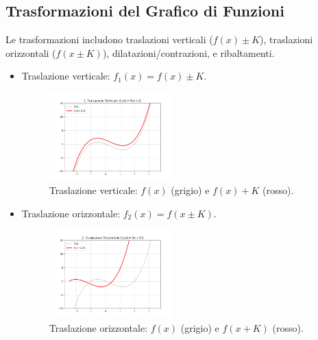 \documentclass[oneside,10pt]{book} %
\begin{document}
\subsection{Trasformazioni del Grafico di Funzioni}
Le trasformazioni includono traslazioni verticali ($f(x) \pm K$), traslazioni orizzontali ($f(x \pm K)$), dilatazioni/contrazioni, e ribaltamenti.

\begin{itemize}
\item Traslazione verticale: $f_1(x) = f(x) \pm K$.
  \begin{figure}[H] %
    \centering
    \includegraphics[width=0.45\textwidth]{img/traslazione_verticale.png}
    \caption{Traslazione verticale: $f(x)$ (grigio) e $f(x)+K$ (rosso).}
  \end{figure}

\item Traslazione orizzontale: $f_2(x) = f(x \pm K)$.
    \begin{figure}[H]
    \centering
    \includegraphics[width=0.45\textwidth]{img/traslazione_orizzontale.png}
    \caption{Traslazione orizzontale: $f(x)$ (grigio) e $f(x+K)$ (rosso).}
  \end{figure}


\end{itemize}
\end{document}
